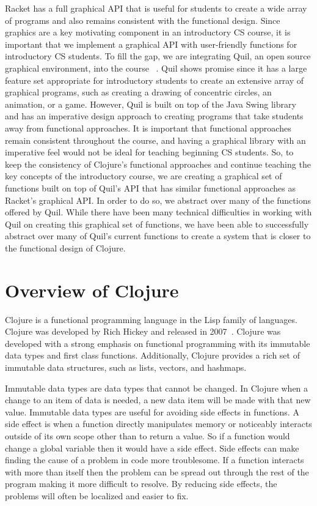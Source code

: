 \documentclass[12pt]{article}
\newcommand{\comment}[1]{}
\newcommand{\emcomment}[1]{\textcolor{ForestGreen}{\comment{Elena: {#1}}}}
\newcommand{\todo}[1]{\textcolor{blue}{\comment{To Do: {#1}}}}
\begin{document}
Racket has a full graphical API that is useful for students to create a wide array of programs and also remains consistent with the functional design. Since graphics are a key motivating component in an introductory CS course, it is important that we implement a graphical API with user-friendly functions for introductory CS students. To fill the gap, we are integrating Quil, an open source graphical environment, into the course ~\cite{Quil}. Quil shows promise since it has a large feature set appropriate for introductory students to create an extensive array of graphical programs, such as creating a drawing of concentric circles, an animation, or a game. However, Quil is built on top of the Java Swing library and has an imperative design approach to creating programs that take students away from functional approaches. It is important that functional approaches remain consistent throughout the course, and having a graphical library with an imperative feel would not be ideal for teaching beginning CS students. So, to keep the consistency of Clojure's functional approaches and continue teaching the key concepts of the introductory course, we are creating a graphical set of functions built on top of Quil's API that has similar functional approaches as Racket's graphical API. In order to do so, we abstract over many of the functions offered by Quil. While there have been many technical difficulties in working with Quil on creating this graphical set of functions, we have been able to successfully abstract over many of Quil's current functions to create a system that is closer to the functional design of Clojure.


\section{Overview of Clojure}\label{sec:clojure}
Clojure is a functional programming language in the Lisp family of languages. Clojure was developed by Rich Hickey and released in 2007~\cite{Hickey:2008}. Clojure was developed with a strong emphasis on functional programming with its immutable data types and first class functions. Additionally, Clojure provides a rich set of immutable data structures, such as lists, vectors, and hashmaps.

Immutable data types are data types that cannot be changed. In Clojure when a change to an item of data is needed, a new data item will be made with that new value. Immutable data types are useful for avoiding side effects in functions. A side effect is when a function directly manipulates memory or noticeably interacts outside of its own scope other than to return a value. So if a function would change a global variable then it would have a side effect. Side effects can make finding the cause of a problem in code more troublesome. If a function interacts with more than itself then the problem can be spread out through the rest of the program making it more difficult to resolve. By reducing side effects, the problems will often be localized and easier to fix. 
\end{document}
